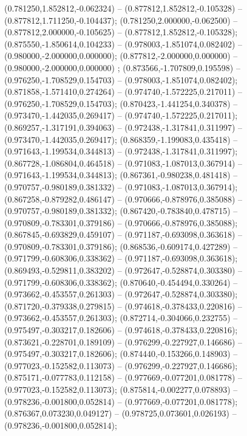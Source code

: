  (0.781250,1.852812,-0.062324) -- (0.877812,1.852812,-0.105328) -- (0.877812,1.711250,-0.104437);
 (0.781250,2.000000,-0.062500) -- (0.877812,2.000000,-0.105625) -- (0.877812,1.852812,-0.105328);
 (0.875550,-1.850614,0.104233) -- (0.978003,-1.851074,0.082402) -- (0.980000,-2.000000,0.000000);
 (0.877812,-2.000000,0.000000) -- (0.980000,-2.000000,0.000000) ;
 (0.873566,-1.707809,0.195598) -- (0.976250,-1.708529,0.154703) -- (0.978003,-1.851074,0.082402);
 (0.871858,-1.571410,0.274264) -- (0.974740,-1.572225,0.217011) -- (0.976250,-1.708529,0.154703);
 (0.870423,-1.441254,0.340378) -- (0.973470,-1.442035,0.269417) -- (0.974740,-1.572225,0.217011);
 (0.869257,-1.317191,0.394063) -- (0.972438,-1.317841,0.311997) -- (0.973470,-1.442035,0.269417);
 (0.868359,-1.199083,0.435418) -- (0.971643,-1.199534,0.344813) -- (0.972438,-1.317841,0.311997);
 (0.867728,-1.086804,0.464518) -- (0.971083,-1.087013,0.367914) -- (0.971643,-1.199534,0.344813);
 (0.867361,-0.980238,0.481418) -- (0.970757,-0.980189,0.381332) -- (0.971083,-1.087013,0.367914);
 (0.867258,-0.879282,0.486147) -- (0.970666,-0.878976,0.385088) -- (0.970757,-0.980189,0.381332);
 (0.867420,-0.783840,0.478715) -- (0.970809,-0.783301,0.379186) -- (0.970666,-0.878976,0.385088);
 (0.867845,-0.693829,0.459107) -- (0.971187,-0.693098,0.363618) -- (0.970809,-0.783301,0.379186);
 (0.868536,-0.609174,0.427289) -- (0.971799,-0.608306,0.338362) -- (0.971187,-0.693098,0.363618);
 (0.869493,-0.529811,0.383202) -- (0.972647,-0.528874,0.303380) -- (0.971799,-0.608306,0.338362);
 (0.870640,-0.454494,0.330264) -- (0.973662,-0.453557,0.261303) -- (0.972647,-0.528874,0.303380);
 (0.871720,-0.379338,0.279815) -- (0.974618,-0.378433,0.220816) -- (0.973662,-0.453557,0.261303);
 (0.872714,-0.304066,0.232755) -- (0.975497,-0.303217,0.182606) -- (0.974618,-0.378433,0.220816);
 (0.873621,-0.228701,0.189109) -- (0.976299,-0.227927,0.146686) -- (0.975497,-0.303217,0.182606);
 (0.874440,-0.153266,0.148903) -- (0.977023,-0.152582,0.113073) -- (0.976299,-0.227927,0.146686);
 (0.875171,-0.077783,0.112158) -- (0.977669,-0.077201,0.081778) -- (0.977023,-0.152582,0.113073);
 (0.875814,-0.002277,0.078893) -- (0.978236,-0.001800,0.052814) -- (0.977669,-0.077201,0.081778);
 (0.876367,0.073230,0.049127) -- (0.978725,0.073601,0.026193) -- (0.978236,-0.001800,0.052814);
